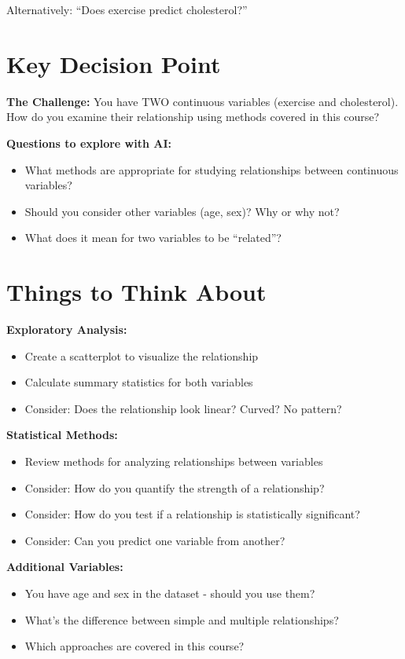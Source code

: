 \documentclass[11pt]{article}
\begin{document}
Alternatively: ``Does exercise predict cholesterol?''

\section*{Key Decision Point}

\begin{tcolorbox}[colback=osaorange!10,colframe=osaorange,boxrule=1pt,arc=2pt]
\textbf{The Challenge:} You have TWO continuous variables (exercise and cholesterol). How do you examine their relationship using methods covered in this course?

\textbf{Questions to explore with AI:}
\begin{itemize}
\item What methods are appropriate for studying relationships between continuous variables?
\item Should you consider other variables (age, sex)? Why or why not?
\item What does it mean for two variables to be ``related''?
\end{itemize}
\end{tcolorbox}

\section*{Things to Think About}

\textbf{Exploratory Analysis:}
\begin{itemize}
\item Create a scatterplot to visualize the relationship
\item Calculate summary statistics for both variables
\item Consider: Does the relationship look linear? Curved? No pattern?
\end{itemize}

\textbf{Statistical Methods:}
\begin{itemize}
\item Review methods for analyzing relationships between variables
\item Consider: How do you quantify the strength of a relationship?
\item Consider: How do you test if a relationship is statistically significant?
\item Consider: Can you predict one variable from another?
\end{itemize}

\textbf{Additional Variables:}
\begin{itemize}
\item You have age and sex in the dataset - should you use them?
\item What's the difference between simple and multiple relationships?
\item Which approaches are covered in this course?
\end{itemize}
\end{document}
